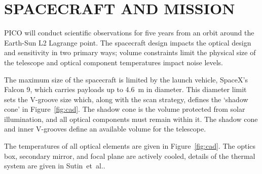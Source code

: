 \documentclass[]{spie}  %
\begin{document}
\section{SPACECRAFT AND MISSION}
\label{sec:spacecraft}


PICO will conduct scientific observations for five years from an orbit around the Earth-Sun L2 Lagrange point. The spacecraft design impacts 
the optical design and sensitivity in two primary ways; volume constraints limit the physical size of the telescope and optical component 
temperatures impact noise levels.  

The maximum size of the spacecraft is limited by the launch vehicle, SpaceX's Falcon 9, which carries payloads up to 4.6~m in diameter. 
This diameter limit sets the V-groove size which, along with the scan strategy, defines the `shadow cone' in Figure~\ref{fig:cad}.  
The shadow cone is the volume protected from solar illumination, and all optical components must remain within it. The shadow cone and 
inner V-grooves define an available volume for the telescope.  

The temperatures of all optical elements are given in Figure~\ref{fig:cad}. 
The optics box, secondary mirror, and focal plane are actively cooled, 
details of the thermal system are given in Sutin~et~al.\cite{brian_spie}. 
\end{document}
